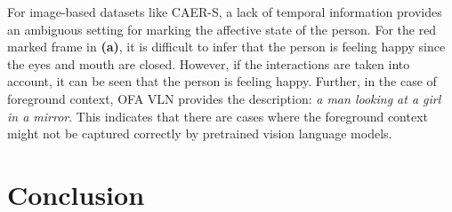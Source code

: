 For image-based datasets like CAER-S, a lack of temporal information provides an ambiguous setting for marking the affective state of the person. For the red marked frame in \textbf{(a)}, it is difficult to infer that the person is feeling happy since the eyes and mouth are closed. However, if the interactions are taken into account, it can be seen that the person is feeling happy. Further, in the case of foreground context, OFA VLN provides the description: \textit{a man looking at a girl in a mirror}. This indicates that there are cases where the foreground context might not be captured correctly by pretrained vision language models.


\section{Conclusion}


